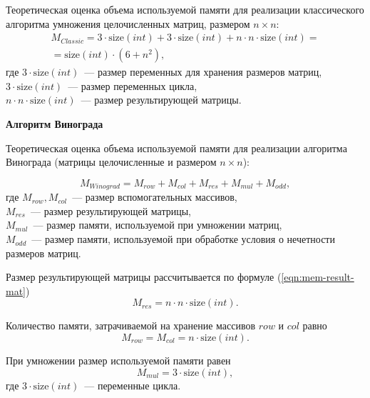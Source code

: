 Теоретическая оценка объема используемой памяти для реализации классического алгоритма умножения целочисленных матриц, размером $n \times n$:
\begin{equation}
	\label{eqn:mem-classic}
	\begin{aligned}
		M_{Classic} = 3 \cdot \text{size}(int) + 3 \cdot \text{size}(int) + n \cdot n \cdot \text{size}(int) = \\
		= \text{size}(int) \cdot (6 + n^2),
	\end{aligned}    
\end{equation}
где $3 \cdot \text{size}(int)$~--- размер переменных для хранения размеров матриц,
\\ $3 \cdot \text{size}(int)$~--- размер переменных цикла,
\\ $n \cdot n \cdot \text{size}(int)$~--- размер результирующей матрицы.

\textbf{Алгоритм Винограда}

Теоретическая оценка объема используемой памяти для реализации алгоритма Винограда (матрицы целочисленные и размером $n \times n$):

\begin{equation}
	M_{Winograd} = M_{row} + M_{col} + M_{res} + M_{mul} + M_{odd},
\end{equation}
где $M_{row}, M_{col}$~--- размер вспомогательных массивов,
\\ $M_{res}$~--- размер результирующей матрицы,
\\ $M_{mul}$~--- размер памяти, используемой при умножении матриц,
\\ $M_{odd}$~--- размер памяти, используемой при обработке условия о нечетности размеров матриц.

Размер результирующей матрицы рассчитывается по формуле (\ref{eqn:mem-result-mat})
\begin{equation}
	\label{eqn:mem-result-mat}
	M_{res} = n \cdot n \cdot \text{size}(int).
\end{equation}

Количество памяти, затрачиваемой на хранение массивов $row$ и $col$ равно
\begin{equation}
	M_{row} = M_{col} = n \cdot \text{size}(int).
\end{equation}

При умножении размер используемой памяти равен
\begin{equation}
	M_{mul} = 3 \cdot \text{size}(int),
\end{equation}
где $3 \cdot \text{size}(int)$~--- переменные цикла.


